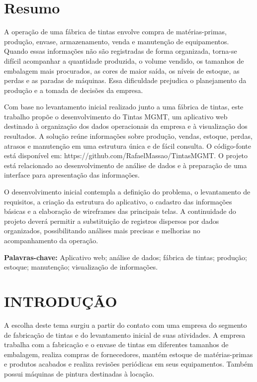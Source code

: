 \documentclass[12pt,a4paper]{article}
\begin{document}
\pagebreak
\section*{Resumo}

A operação de uma fábrica de tintas envolve compra de matérias-primas, produção, envase, armazenamento, venda e manutenção de equipamentos. Quando essas informações não são registradas de forma organizada, torna-se difícil acompanhar a quantidade produzida, o volume vendido, os tamanhos de embalagem mais procurados, as cores de maior saída, os níveis de estoque, as perdas e as paradas de máquinas. Essa dificuldade prejudica o planejamento da produção e a tomada de decisões da empresa.

Com base no levantamento inicial realizado junto a uma fábrica de tintas, este trabalho propõe o desenvolvimento do Tintas MGMT, um aplicativo web destinado à organização dos dados operacionais da empresa e à visualização dos resultados. A solução reúne informações sobre produção, vendas, estoque, perdas, atrasos e manutenção em uma estrutura única e de fácil consulta. O código-fonte está disponível em: https://github.com/RafaelMassao/TintasMGMT. O projeto está relacionado ao desenvolvimento de análise de dados e à preparação de uma interface para apresentação das informações.

O desenvolvimento inicial contempla a definição do problema, o levantamento de requisitos, a criação da estrutura do aplicativo, o cadastro das informações básicas e a elaboração de wireframes das principais telas. A continuidade do projeto deverá permitir a substituição de registros dispersos por dados organizados, possibilitando análises mais precisas e melhorias no acompanhamento da operação.

\textbf{Palavras-chave:} Aplicativo web; análise de dados; fábrica de tintas; produção; estoque; manutenção; visualização de informações.
\pagebreak

\tableofcontents
\pagebreak

\listoffigures

\pagestyle{fancy}
\clearpage
\section{INTRODUÇÃO}
\enlargethispage{-4\baselineskip}
A escolha deste tema surgiu a partir do contato com uma empresa do segmento de fabricação de tintas e do levantamento inicial de suas atividades. A empresa trabalha com a fabricação e o envase de tintas em diferentes tamanhos de embalagem, realiza compras de fornecedores, mantém estoque de matérias-primas e produtos acabados e realiza revisões periódicas em seus equipamentos. Também possui máquinas de pintura destinadas à locação.
\end{document}
